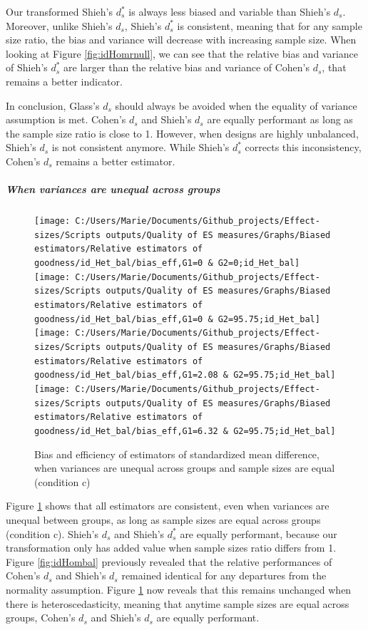 \documentclass[
  man,floatsintext]{apa6}
\begin{document}
Our transformed Shieh's \(d^*_s\) is always less biased and variable than Shieh's \(d_s\). Moreover, unlike Shieh's \(d_s\), Shieh's \(d^*_s\) is consistent, meaning that for any sample size ratio, the bias and variance will decrease with increasing sample size. When looking at Figure \ref{fig:idHomrnull}, we can see that the relative bias and variance of Shieh's \(d^*_s\) are larger than the relative bias and variance of Cohen's \(d_s\), that remains a better indicator.

In conclusion, Glass's \(d_s\) should always be avoided when the equality of variance assumption is met. Cohen's \(d_s\) and Shieh's \(d_s\) are equally performant as long as the sample size ratio is close to 1. However, when designs are highly unbalanced, Shieh's \(d_s\) is not consistent anymore. While Shieh's \(d^*_s\) corrects this inconsistency, Cohen's \(d_s\) remains a better estimator.

\hypertarget{when-variances-are-unequal-across-groups}{%
\subparagraph{When variances are unequal across groups}\label{when-variances-are-unequal-across-groups}}

\begin{figure}

{\centering \texttt{[image: C:/Users/Marie/Documents/Github\_projects/Effect-sizes/Scripts outputs/Quality of ES measures/Graphs/Biased estimators/Relative estimators of goodness/id\_Het\_bal/bias\_eff,G1=0 \& G2=0;id\_Het\_bal]} \texttt{[image: C:/Users/Marie/Documents/Github\_projects/Effect-sizes/Scripts outputs/Quality of ES measures/Graphs/Biased estimators/Relative estimators of goodness/id\_Het\_bal/bias\_eff,G1=0 \& G2=95.75;id\_Het\_bal]} \texttt{[image: C:/Users/Marie/Documents/Github\_projects/Effect-sizes/Scripts outputs/Quality of ES measures/Graphs/Biased estimators/Relative estimators of goodness/id\_Het\_bal/bias\_eff,G1=2.08 \& G2=95.75;id\_Het\_bal]} \texttt{[image: C:/Users/Marie/Documents/Github\_projects/Effect-sizes/Scripts outputs/Quality of ES measures/Graphs/Biased estimators/Relative estimators of goodness/id\_Het\_bal/bias\_eff,G1=6.32 \& G2=95.75;id\_Het\_bal]} 

}

\caption{Bias and efficiency of estimators of standardized mean difference, when variances are unequal across groups and sample sizes are equal (condition c)}\label{fig:idHetbal}
\end{figure}

Figure \ref{fig:idHetbal} shows that all estimators are consistent, even when variances are unequal between groups, as long as sample sizes are equal across groups (condition c). Shieh's \(d_s\) and Shieh's \(d^*_s\) are equally performant, because our transformation only has added value when sample sizes ratio differs from 1. Figure \ref{fig:idHombal} previously revealed that the relative performances of Cohen's \(d_s\) and Shieh's \(d_s\) remained identical for any departures from the normality assumption. Figure \ref{fig:idHetbal} now reveals that this remains unchanged when there is heteroscedasticity, meaning that anytime sample sizes are equal across groups, Cohen's \(d_s\) and Shieh's \(d_s\) are equally performant.
\end{document}
